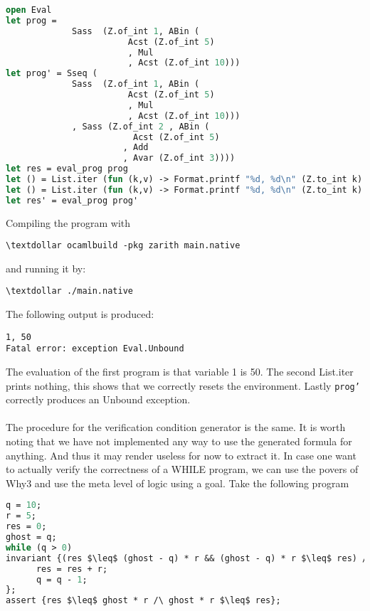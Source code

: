 \begin{lstlisting}[caption={ocaml program using the evaluator},label={lst:ocamlexample},language=sml]
open Eval
let prog =
             Sass  (Z.of_int 1, ABin (
                        Acst (Z.of_int 5)
                        , Mul
                        , Acst (Z.of_int 10)))
let prog' = Sseq (
             Sass  (Z.of_int 1, ABin (
                        Acst (Z.of_int 5)
                        , Mul
                        , Acst (Z.of_int 10)))
             , Sass (Z.of_int 2 , ABin (
                         Acst (Z.of_int 5)
                       , Add
                       , Avar (Z.of_int 3))))
let res = eval_prog prog
let () = List.iter (fun (k,v) -> Format.printf "%d, %d\n" (Z.to_int k) (Z.to_int v)) res
let () = List.iter (fun (k,v) -> Format.printf "%d, %d\n" (Z.to_int k) (Z.to_int v)) sigma.lst
let res' = eval_prog prog'
\end{lstlisting}

Compiling the program with

\begin{lstlisting}
\textdollar ocamlbuild -pkg zarith main.native
\end{lstlisting}

and running it by:

\begin{lstlisting}
\textdollar ./main.native
\end{lstlisting}

The following output is produced:

\begin{lstlisting}
1, 50
Fatal error: exception Eval.Unbound
\end{lstlisting}

The evaluation of the first program is that variable 1 is 50. The second List.iter prints nothing,
this shows that we correctly resets the environment. Lastly \texttt{prog'} correctly produces an Unbound exception.
\\~\\
The procedure for the verification condition generator is the same.
It is worth noting that we have not implemented any way to use the generated formula for anything.
And thus it may render useless for now to extract it.
In case one want to actually verify the correctness of a WHILE program, we can use the povers of Why3 and use the meta level of logic using a goal.
Take the following program

\begin{lstlisting}[caption={WHILE program which multiples q and r by repeated addition},label={lst:whileexample},language=sml]
q = 10;
r = 5;
res = 0;
ghost = q;
while (q > 0)
invariant {(res $\leq$ (ghost - q) * r && (ghost - q) * r $\leq$ res) /\ 0 \leq q} {
      res = res + r;
      q = q - 1;
};
assert {res $\leq$ ghost * r /\ ghost * r $\leq$ res};
\end{lstlisting}

